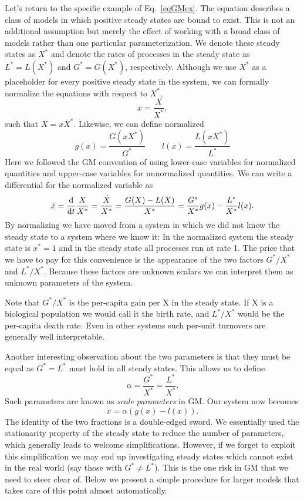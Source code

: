 \documentclass{article}
\newcommand{\eq}[1]{\begin{equation}#1\end{equation}}
\begin{document}
Let's return to the specific example of Eq.~\ref{eqGMex}. The equation describes a class of models in which positive steady states are bound to exist. This is not an additional assumption but merely the effect of working with a broad class of models rather than one particular parameterization. We denote these steady states as $X^*$ and denote the rates of processes in the steady state as $L^*=L(X^*)$ and $G^*=G(X^*)$, respectively. Although we use $X^*$ as a placeholder for every positive steady state in the system, we can formally normalize the equations with respect to $X^*$,
\eq{
x=\frac{X}{X^*},
}
such that $X=xX^*$. Likewise, we can define normalized
\eq{
g(x) = \frac{G(xX^*)}{G^*} \quad\quad l(x)=\frac{L(xX^*)}{L^*}
}
Here we followed the GM convention of using lower-case variables for normalized quantities and upper-case variables for unnormalized quantities. We can write a differential for the normalized variable as
\eq{
\dot{x}=\frac{\rm d}{{\rm d}t}\frac{X}{X^*}=\frac{\dot{X}}{X^*} = \frac{G(X)-L(X)}{X^*} = \frac{G^*}{X^*}g(x)-\frac{L^*}{X^*}l(x). 
}
By normalizing we have moved from a system in which we did not know the steady state to a system where we know it: In the normalized system the steady state is $x^*=1$ and in the steady state all processes run at rate 1. The price that we have to pay for this convenience is the appearance of the two factors $G^*/X^*$ and $L^*/X^*$. Because these factors are unknown scalars we can interpret them as unknown parameters of the system. 

Note that $G^*/X^*$ is the per-capita gain per X in the steady state. If X is a biological population we would call it the birth rate, and $L^*/X^*$ would be the per-capita death rate. Even in other systems such per-unit turnovers are generally well interpretable. 

Another interesting observation about the two parameters is that they must be equal as $G^*=L^*$ must hold in all steady states. This allows us to define
\eq{
\alpha = \frac{G^*}{X^*} = \frac{L^*}{X^*}.
}
Such parameters are known as \emph{scale parameters} in GM.
Our system now becomes 
\eq{
\dot{x}= \alpha (g(x)-l(x)).
}
The identity of the two fractions is a double-edged sword. We essentially used the stationarity property of the steady state to reduce the number of parameters, which generally leads to welcome simplifications. However, if we forget to exploit this simplification we may end up investigating steady states which cannot exist in the real world (say those with $G^*\neq L^*$). This is the one risk in GM that we need to steer clear of. Below we present a simple procedure for larger models that takes care of this point almost automatically. 
\end{document}
